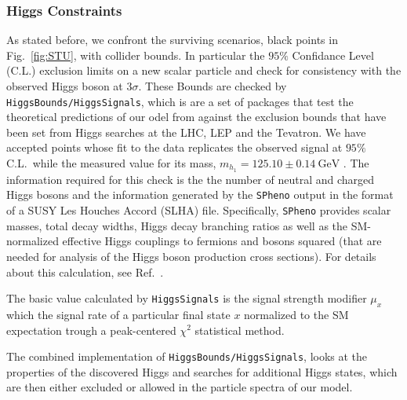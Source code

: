 
\subsubsection{Higgs Constraints}

As stated before, we confront the surviving scenarios, black points in Fig.~\ref{fig:STU}, with collider bounds. 
%
In particular the $95\%$ Confidance Level (C.L.) exclusion limits on a new scalar particle and check for consistency with the observed Higgs boson at $3 \sigma$. 
%
These Bounds are checked by \texttt{HiggsBounds/HiggsSignals},  which  is are a set of packages that test the theoretical predictions of our odel from against the exclusion bounds that have been set from Higgs searches at the LHC, LEP and the Tevatron. 
%
We have accepted points whose fit to the data replicates the observed signal at $95\%$ C.L.~while the measured value for its mass, $m_{h_1} = 125.10 \pm 0.14~\textrm{GeV}$ \cite{Tanabashi:2018oca}. 
%
The information required for this check is the the number of neutral and charged Higgs bosons and the information generated by the \texttt{SPheno} output in the format of a SUSY Les Houches Accord (SLHA) \cite{Skands:2003cj} file.
%
Specifically, \texttt{SPheno} provides scalar masses, total decay widths, Higgs decay branching ratios as well as the SM-normalized effective Higgs couplings to fermions and bosons squared (that are needed for analysis of the Higgs boson production cross sections). 
%
For details about this calculation, see Ref.~\cite{Bechtle:2013wla}.

The basic value calculated by \texttt{HiggsSignals} is the signal strength modifier $\mu_{x}$ which  the signal rate of a particular final state $x$ normalized to the SM expectation trough a peak-centered $\chi^2$ statistical method.

The combined implementation of \texttt{HiggsBounds/HiggsSignals}, looks at the properties of the discovered Higgs and searches for additional Higgs states, which are then either excluded or allowed in the particle spectra of our model. 

